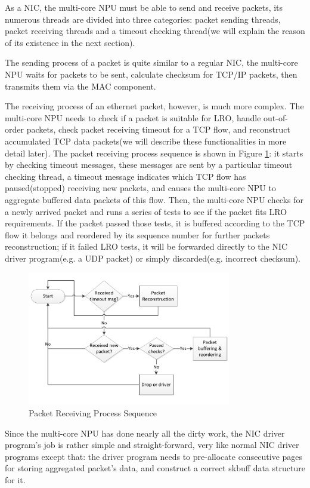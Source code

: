 \documentclass[conference]{IEEEtran}
\begin{document}
As a NIC, the multi-core NPU must be able to send and receive packets, its numerous threads are divided into three categories: packet sending threads, packet receiving threads and a timeout checking thread(we will explain the reason of its existence in the next section).

The sending process of a packet is quite similar to a regular NIC, the multi-core NPU waits for packets to be sent, calculate checksum for TCP/IP packets, then transmits them via the MAC component.

The receiving process of an ethernet packet, however, is much more complex. The multi-core NPU needs to check if a packet is suitable for LRO, handle out-of-order packets, check packet receiving timeout for a TCP flow, and reconstruct accumulated TCP data packets(we will describe these functionalities in more detail later). The packet receiving process sequence is shown in Figure \ref{packet receiving process sequence}: it starts by checking timeout messages, these messages are sent by a particular timeout checking thread, a timeout message indicates which TCP flow has paused(stopped) receiving new packets, and causes the multi-core NPU to aggregate buffered data packets of this flow. Then, the multi-core NPU checks for a newly arrived packet and runs a series of tests to see if the packet fits LRO requirements. If the packet passed those tests, it is buffered according to the TCP flow it belongs and reordered by its sequence number for further packets reconstruction; if it failed LRO tests, it will be forwarded directly to the NIC driver program(e.g. a UDP packet) or simply discarded(e.g. incorrect checksum).
\begin{figure}[!t]
\centering
\includegraphics[width=3.5in]{packet_receiving_process_sequence}
\caption{Packet Receiving Process Sequence}
\label{packet receiving process sequence}
\end{figure}
Since the multi-core NPU has done nearly all the dirty work, the NIC driver program's job is rather simple and straight-forward, very like normal NIC driver programs except that: the driver program needs to pre-allocate consecutive pages for storing aggregated packet's data, and construct a correct skbuff data structure for it.
\end{document}
